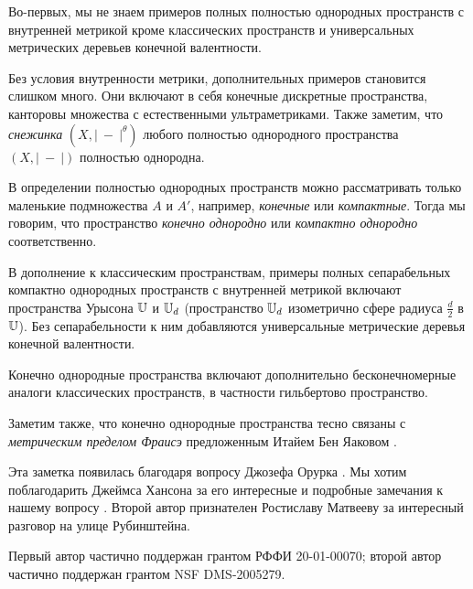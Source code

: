 \documentclass[a4paper,10pt]{article}
\begin{document}
Во-первых, мы не знаем примеров полных полностью однородных пространств с внутренней метрикой кроме классических пространств и универсальных метрических деревьев конечной валентности.

Без условия внутренности метрики, дополнительных примеров становится слишком много.
Они включают в себя конечные дискретные пространства, канторовы множества с естественными ультраметриками.
Также заметим, что \emph{снежинка} $(X,|\ -\ |^\theta)$ любого полностью однородного пространства $(X,|\ -\ |)$ полностью однородна.

В определении полностью однородных пространств можно рассматривать только маленькие подмножества $A$ и $A'$,
например, \emph{конечные} или \emph{компактные}.
Тогда мы говорим, что пространство  \emph{конечно однородно} или  \emph{компактно однородно} соответственно.

В дополнение к классическим пространствам,
примеры полных сепарабельных компактно однородных пространств с внутренней метрикой включают пространства Урысона  $\mathbb{U}$ и $\mathbb{U}_d$ (пространство $\mathbb{U}_d$ изометрично сфере радиуса $\tfrac d2$ в $\mathbb{U}$).
Без сепарабельности к ним добавляются универсальные метрические деревья конечной валентности.

Конечно однородные пространства включают дополнительно бесконечномерные аналоги классических пространств,
в частности гильбертово пространство.

Заметим также, что конечно однородные пространства тесно связаны с \emph{метрическим пределом Фраисэ} предложенным Итайем Бен Яаковом \cite{ben-yaacov}. 

Эта заметка появилась благодаря вопросу Джозефа Орурка \cite{rourke}.
Мы хотим поблагодарить Джеймса Хансона за его интересные и подробные замечания к нашему вопросу \cite{hanson}.
Второй автор признателен Ростиславу Матвееву за интересный разговор на улице Рубинштейна.

Первый автор частично поддержан грантом РФФИ 20-01-00070;
второй автор частично поддержан грантом NSF DMS-2005279.

{\sloppy
\printbibliography[heading=bibintoc]
\fussy
}
\end{document}
